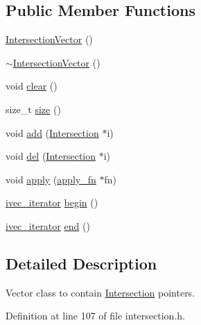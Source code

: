 \subsection*{Public Member Functions}
\begin{DoxyCompactItemize}
\item 
\hyperlink{classShipCAD_1_1IntersectionVector_a35136e558e5a0ec4059f5e051735d5fc}{Intersection\-Vector} ()
\item 
\hyperlink{classShipCAD_1_1IntersectionVector_a922662b04f581583d4ef4cd07bc82222}{$\sim$\-Intersection\-Vector} ()
\item 
void \hyperlink{classShipCAD_1_1IntersectionVector_afcee2220cc3d3fc2744a75ccdb2b2130}{clear} ()
\item 
size\-\_\-t \hyperlink{classShipCAD_1_1IntersectionVector_ae9d4002691a3a50b3f30b845e968a043}{size} ()
\item 
void \hyperlink{classShipCAD_1_1IntersectionVector_a4e0eaa374b7b33f5986aa3bbc0a610a3}{add} (\hyperlink{classShipCAD_1_1Intersection}{Intersection} $\ast$i)
\item 
void \hyperlink{classShipCAD_1_1IntersectionVector_a387b69c351ab2ad04f218b844c7bf0c4}{del} (\hyperlink{classShipCAD_1_1Intersection}{Intersection} $\ast$i)
\item 
void \hyperlink{classShipCAD_1_1IntersectionVector_a531723a46d937398221c94d0727b42b1}{apply} (\hyperlink{classShipCAD_1_1IntersectionVector_a15b8a08f6a1b232f9825c6cbbc0fa9a9}{apply\-\_\-fn} $\ast$fn)
\item 
\hyperlink{classShipCAD_1_1IntersectionVector_a02685a86dd24a49a1664a07172d709ff}{ivec\-\_\-iterator} \hyperlink{classShipCAD_1_1IntersectionVector_abab8d5c4cc1150b73094360c826abda9}{begin} ()
\item 
\hyperlink{classShipCAD_1_1IntersectionVector_a02685a86dd24a49a1664a07172d709ff}{ivec\-\_\-iterator} \hyperlink{classShipCAD_1_1IntersectionVector_a94cbd7900470502f5be601a39dd93333}{end} ()
\end{DoxyCompactItemize}


\subsection{Detailed Description}
Vector class to contain \hyperlink{classShipCAD_1_1Intersection}{Intersection} pointers. 



Definition at line 107 of file intersection.\-h.



